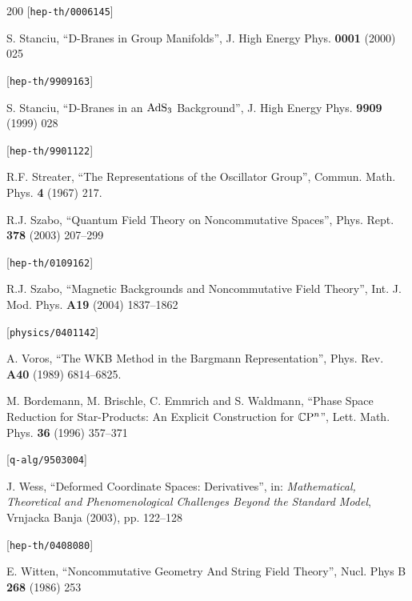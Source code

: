 \begin{thebibliography}{200}
 [{\tt hep-th/0006145}] 

 S. Stanciu, ``D-Branes in Group Manifolds'', J. High Energy Phys. {\bf 0001} (2000) 025 

 [{\tt hep-th/9909163}] 

 S. Stanciu, ``D-Branes in an $\operatorname{AdS}_3$ Background'', J. High Energy Phys. {\bf 9909} (1999) 028 

 [{\tt hep-th/9901122}] 

 R.F. Streater, ``The Representations of the Oscillator Group'', Commun. Math. Phys. {\bf 4} (1967) 217. 

 R.J. Szabo, ``Quantum Field Theory on Noncommutative Spaces'', Phys. Rept. {\bf 378} (2003) 207--299 

 [{\tt hep-th/0109162}] 

 R.J. Szabo, ``Magnetic Backgrounds and Noncommutative Field Theory'', Int. J. Mod. Phys. {\bf A19} (2004) 1837--1862 

 [{\tt physics/0401142}] 

 A. Voros, ``The WKB Method in the Bargmann Representation'', Phys. Rev. {\bf A40} (1989) 6814--6825. 

 M. Bordemann, M. Brischle, C. Emmrich and S. Waldmann, ``Phase Space Reduction for Star-Products: An Explicit Construction for ${\mathbb C}{\rm P}^n$'', Lett. Math. Phys. {\bf 36} (1996) 357--371 

 [{\tt q-alg/9503004}] 

 J. Wess, ``Deformed Coordinate Spaces: Derivatives'', in: {\sl Mathematical, Theoretical and Phenomenological Challenges Beyond the Standard Model}, Vrnjacka Banja (2003), pp. 122--128 

 [{\tt hep-th/0408080}] 

 E. Witten, ``Noncommutative Geometry And String Field Theory'', Nucl. Phys B {\bf 268} (1986) 253
\end{thebibliography}
